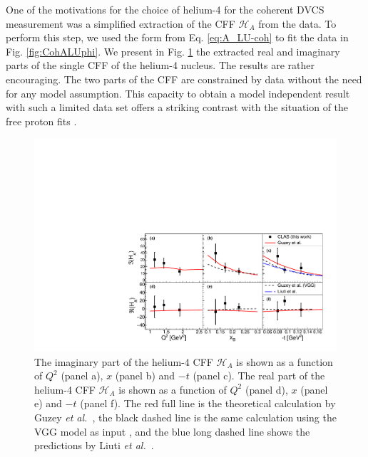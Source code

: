 \documentclass[aps,prc,preprint,superscriptaddress]{revtex4}
\begin{document}
One of the motivations for the choice of helium-4 for the coherent DVCS measurement was
a simplified extraction of the CFF $\mathcal{H}_A$ from the
data. To perform this step, we used the form from Eq. \ref{eq:A_LU-coh} to fit the data in Fig. 
\ref{fig:CohALUphi}. We present in Fig. \ref{fig:CohCFF} the extracted real and imaginary parts 
of the single CFF of the helium-4 nucleus. The results are rather encouraging. The two parts
of the CFF are constrained by data without the need for any model assumption. This capacity to obtain a
model independent result with such a limited data set offers a striking contrast with the
situation of the free proton fits \cite{Dupre:2016mai,Dupre:2017hfs}.

\begin{figure}[tbp!]
\center
\includegraphics[width=14cm]{Coherent_CFF.pdf}
	\caption{The imaginary part of the helium-4 CFF $\mathcal{H}_A$ is shown as 
        a function of $Q^2$ (panel a), $x$ (panel b) and 
	$-t$ (panel c). The real part of the helium-4 CFF $\mathcal{H}_A$ is shown as 
        a function of $Q^2$ (panel d), $x$ (panel e) and 
	$-t$ (panel f). The red full line is the theoretical calculation by 
	Guzey {\it et al.}~\cite{Guzey:2003jh,Guzey:2008th}, the black dashed line is the same calculation 
	using the VGG model as input \cite{Vanderhaeghen:1999xj,Guidal:2004nd}, and
	the blue long dashed line shows the predictions by Liuti {\it et 
	al.}~\cite{Liuti:2005gi,GonzalezHernandez:2012jv}.} 
\label{fig:CohCFF}
\end{figure}
\end{document}
